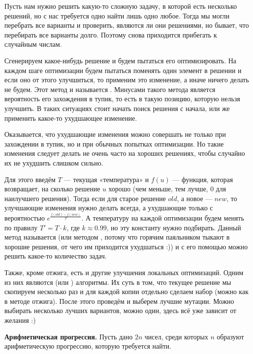 Пусть нам нужно решить какую-то сложную задачу, в которой есть несколько решений, но с нас требуется одно найти лишь одно любое. Тогда мы могли перебрать все варианты и проверить, являются ли они решениями, но бывает, что перебирать все варианты долго. Поэтому снова приходится прибегать к случайным числам.

Сгенерируем какое-нибудь решение и будем пытаться его оптимизировать. На каждом шаге оптимизации будем пытаться поменять один элемент в решении и если оно от этого улучшиться, то применим это изменение, а иначе ничего делать не будем. Этот метод и называется . Минусами такого метода является вероятность его захождения в тупик, то есть в такую позицию, которую нельзя улучшить. В таких ситуациях стоит начать поиск решения с начала, или же применить какое-то ухудшающее изменение.

Оказывается, что ухудшающие изменения можно совершать не только при захождении в тупик, но и при обычных попытках оптимизации. Но такие изменения следует делать не очень часто на хороших решениях, чтобы случайно их не ухудшить слишком сильно.

Для этого введём $T$ — текущая «температура» и $f(u)$ — функция, которая возвращает, на сколько решение $u$ хорошо (чем меньше, тем лучше, $0$ для наилучшего решения). Тогда если для старое решение $old$, а новое — $new$, то улучшающие изменения нужно делать всегда, а ухудшающие только с вероятностью $e^{\frac{f(old) - f(new)}{T}}$. А температуру на каждой оптимизации будем менять по правилу $T' = T \cdot k$, где $k \approx 0.99$, но эту константу нужно подбирать. Данный метод называется  (или методом , потому что горячим паяльником тыкают в хорошие решения, от чего им приходится ухудшаться :)) и с его помощью можно решить какое-то количество задач.

Также, кроме отжига, есть и другие улучшения локальных оптимизаций. Одним из них являются  (или ) алгоритмы. Их суть в том, что текущее решение мы скопируем несколько раз и для каждой копии отдельно сделаем набор  (можно как в методе отжига). После этого проведём  и выберем лучшие мутации. Можно выбирать несколько лучших вариантов, можно один, здесь всё уже зависит от желания :)


\textbf{Арифметическая прогрессия.} Пусть дано $2n$ чисел, среди которых $n$ образуют арифметическую прогрессию, которую требуется найти.

